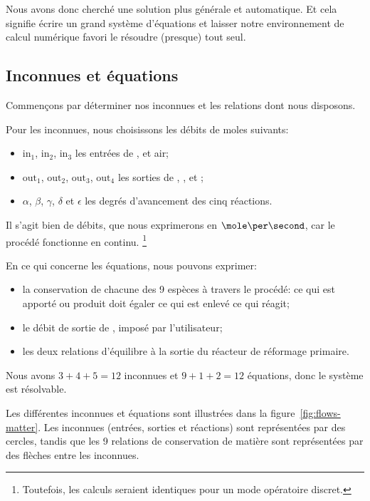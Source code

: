 \documentclass[a4paper,12pt]{article}
\begin{document}
Nous avons donc cherché une solution plus générale et automatique.
Et cela signifie écrire un grand système d'équations et laisser notre environnement
de calcul numérique favori le résoudre (presque) tout seul.

\subsection{Inconnues et équations}

Commençons par déterminer nos inconnues et les relations dont nous disposons.

Pour les inconnues, nous choisissons les débits de moles suivants:
\begin{itemize}
    \item $\mathrm{in}_1$, $\mathrm{in}_2$, $\mathrm{in}_3$
        les entrées de ,  et air;
    \item $\mathrm{out}_1$, $\mathrm{out}_2$, $\mathrm{out}_3$,
        $\mathrm{out}_4$ les sorties de , ,  et ;
    \item $\alpha$, $\beta$, $\gamma$, $\delta$ et $\epsilon$
        les degrés d'avancement des cinq réactions.
\end{itemize}
Il s'agit bien de débits, que nous exprimerons en $\mole\per\second$,
car le procédé fonctionne en continu.%
\footnote{Toutefois, les calculs seraient identiques
pour un mode opératoire discret.}

En ce qui concerne les équations, nous pouvons exprimer:
\begin{itemize}
    \item la conservation de chacune des 9 espèces à travers le procédé:
        ce qui est apporté ou produit doit égaler ce qui est enlevé ce qui réagit;
    \item le débit de sortie de , imposé par l'utilisateur;
    \item les deux relations d'équilibre à la sortie du réacteur de réformage
        primaire.
\end{itemize}

Nous avons $3+4+5 = 12$ inconnues et $9+1+2 = 12$ équations,
donc le système est résolvable.

Les différentes inconnues et équations sont illustrées dans
la figure~\ref{fig:flows-matter}.
Les inconnues (entrées, sorties et réactions) sont représentées par des cercles,
tandis que les 9 relations de conservation de matière
sont représentées par des flèches entre les inconnues.
\end{document}

